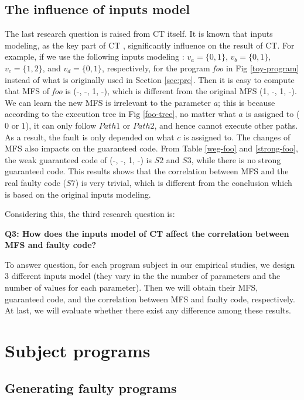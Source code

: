 \documentclass{sig-alternate-05-2015}
\begin{document}
\subsection{The influence of inputs model}
The last research question is raised from CT itself. It is known that inputs modeling, as the key part of CT \cite{nie2011survey}, significantly influence on the result of CT. For example, if we use the following inputs modeling : $v_{a} = \{ 0, 1 \}$, $v_{b} = \{ 0, 1\}$, $v_{c} = \{ 1, 2\}$, and $v_{d} = \{ 0, 1\}$, respectively, for the program \emph{foo} in Fig \ref{toy-program} instead of what is originally used in Section \ref{sec:pre}. Then it is easy to compute that MFS of \emph{foo} is (-, -, 1, -), which is different from the original MFS (1, -, 1, -). We can learn the new MFS is irrelevant to the parameter $a$; this is because according to the execution tree in Fig \ref{foo-tree}, no matter what $a$ is assigned to ($0$ or $1$), it can only follow $Path 1$ or $Path 2$, and hence cannot execute other paths. As a result, the fault is only depended on what $c$ is assigned to. The changes of MFS also impacts on the guaranteed code. From Table \ref{weg-foo} and \ref{strong-foo}, the weak guaranteed code of (-, -, 1, -) is $S2$ and $S3$, while there is no strong guaranteed code. This results shows that the correlation between MFS and the real faulty code ($S7$) is  very trivial, which is different from the conclusion which is based on the original inputs modeling.

Considering this, the third research question is:

\textbf{Q3: How does the inputs model of CT affect the correlation between MFS and faulty code?}


To answer question, for each program subject in our empirical studies, we design 3 different inputs model (they vary in the the number of parameters and the number of values for each parameter). Then we will obtain their MFS, guaranteed code, and the correlation between MFS and faulty code, respectively. At last, we will evaluate whether there exist any difference among these results.


\section{Subject programs}\label{sec:subjects}

\subsection{Generating faulty programs}
\end{document}
